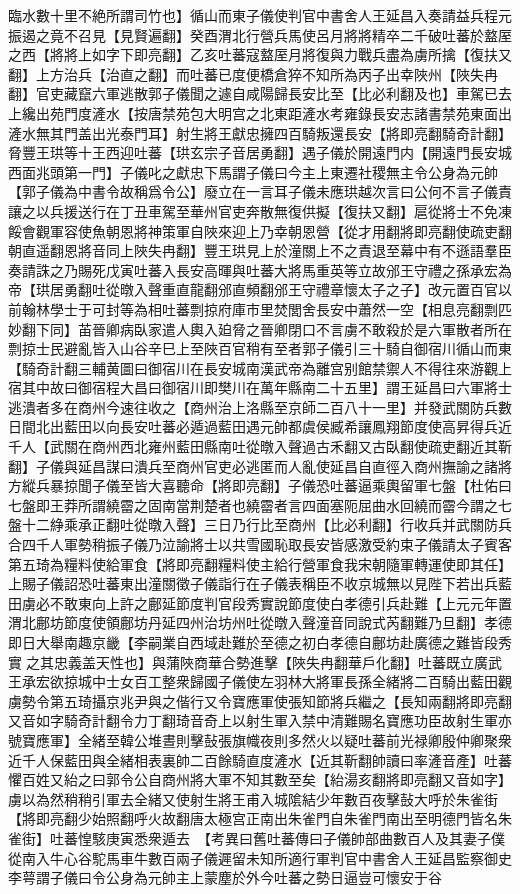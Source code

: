 臨水數十里不絶所謂司竹也】循山而東子儀使判官中書舍人王延昌入奏請益兵程元振遏之竟不召見【見賢遍翻】癸酉渭北行營兵馬使呂月將將精卒二千破吐蕃於盩厔之西【將將上如字下即亮翻】乙亥吐蕃寇盩厔月將復與力戰兵盡為虜所擒【復扶又翻】上方治兵【治直之翻】而吐蕃已度便橋倉猝不知所為丙子出幸陜州【陜失冉翻】官吏藏竄六軍逃散郭子儀聞之遽自咸陽歸長安比至【比必利翻及也】車駕已去上纔出苑門度滻水【按唐禁苑包大明宫之北東距滻水考雍錄長安志諸書禁苑東面出滻水無其門盖出光泰門耳】射生將王獻忠擁四百騎叛還長安【將即亮翻騎奇計翻】脅豐王珙等十王西迎吐蕃【珙玄宗子音居勇翻】遇子儀於開遠門内【開遠門長安城西面兆頭第一門】子儀叱之獻忠下馬謂子儀曰今主上東遷社稷無主令公身為元帥【郭子儀為中書令故稱爲令公】廢立在一言耳子儀未應珙越次言曰公何不言子儀責讓之以兵援送行在丁丑車駕至華州官吏奔散無復供擬【復扶又翻】扈從將士不免凍餒會觀軍容使魚朝恩將神策軍自陜來迎上乃幸朝恩營【從才用翻將即亮翻使疏吏翻朝直遥翻恩將音同上陜失冉翻】豐王珙見上於潼關上不之責退至幕中有不遜語羣臣奏請誅之乃賜死戊寅吐蕃入長安高暉與吐蕃大將馬重英等立故邠王守禮之孫承宏為帝【珙居勇翻吐從暾入聲重直龍翻邠直頻翻邠王守禮章懷太子之子】改元置百官以前翰林學士于可封等為相吐蕃剽掠府庫市里焚閭舍長安中蕭然一空【相息亮翻剽匹妙翻下同】苖晉卿病臥家遣人輿入廹脅之晉卿閉口不言虜不敢殺於是六軍散者所在剽掠士民避亂皆入山谷辛巳上至陜百官稍有至者郭子儀引三十騎自御宿川循山而東【騎奇計翻三輔黄圖曰御宿川在長安城南漢武帝為離宫别館禁禦人不得往來游觀上宿其中故曰御宿程大昌曰御宿川即樊川在萬年縣南二十五里】謂王延昌曰六軍將士逃潰者多在商州今速往收之【商州治上洛縣至京師二百八十一里】并發武關防兵數日間北出藍田以向長安吐蕃必遁過藍田遇元帥都虞侯臧希讓鳳翔節度使高昇得兵近千人【武關在商州西北雍州藍田縣南吐從暾入聲過古禾翻又古臥翻使疏吏翻近其靳翻】子儀與延昌謀曰潰兵至商州官吏必逃匿而人亂使延昌自直徑入商州撫諭之諸將方縱兵暴掠聞子儀至皆大喜聽命【將即亮翻】子儀恐吐蕃逼乘輿留軍七盤【杜佑曰七盤即王莽所謂繞霤之固南當荆楚者也繞霤者言四面塞阨屈曲水回繞而霤今謂之七盤十二䋫乘承正翻吐從暾入聲】三日乃行比至商州【比必利翻】行收兵并武關防兵合四千人軍勢稍振子儀乃泣諭將士以共雪國恥取長安皆感激受約束子儀請太子賓客第五琦為糧料使給軍食【將即亮翻糧料使主給行營軍食我宋朝隨軍轉運使即其任】上賜子儀詔恐吐蕃東出潼關徵子儀詣行在子儀表稱臣不收京城無以見陛下若出兵藍田虜必不敢東向上許之鄜延節度判官段秀實說節度使白孝德引兵赴難【上元元年置渭北鄜坊節度使領鄜坊丹延四州治坊州吐從暾入聲潼音同說式芮翻難乃旦翻】孝德即日大舉南趣京畿【李嗣業自西域赴難於至德之初白孝德自鄜坊赴廣德之難皆段秀實之其忠義盖天性也】與蒲陜商華合勢進擊【陜失冉翻華戶化翻】吐蕃既立廣武王承宏欲掠城中士女百工整衆歸國子儀使左羽林大將軍長孫全緒將二百騎出藍田觀虜勢令第五琦攝京兆尹與之偕行又令寶應軍使張知節將兵繼之【長知兩翻將即亮翻又音如字騎奇計翻令力丁翻琦音奇上以射生軍入禁中清難賜名寶應功臣故射生軍亦號寶應軍】全緒至韓公堆晝則擊鼔張旗幟夜則多然火以疑吐蕃前光禄卿殷仲卿聚衆近千人保藍田與全緒相表裏帥二百餘騎直度滻水【近其靳翻帥讀曰率滻音產】吐蕃懼百姓又紿之曰郭令公自商州將大軍不知其數至矣【紿湯亥翻將即亮翻又音如字】虜以為然稍稍引軍去全緒又使射生將王甫入城隂結少年數百夜擊鼔大呼於朱雀街【將即亮翻少始照翻呼火故翻唐太極宫正南出朱雀門自朱雀門南出至明德門皆名朱雀街】吐蕃惶駭庚寅悉衆遁去　【考異曰舊吐蕃傳曰子儀帥部曲數百人及其妻子僕從南入牛心谷駝馬車牛數百兩子儀遲留未知所適行軍判官中書舍人王延昌監察御史李萼謂子儀曰令公身為元帥主上蒙塵於外今吐蕃之勢日逼豈可懷安于谷